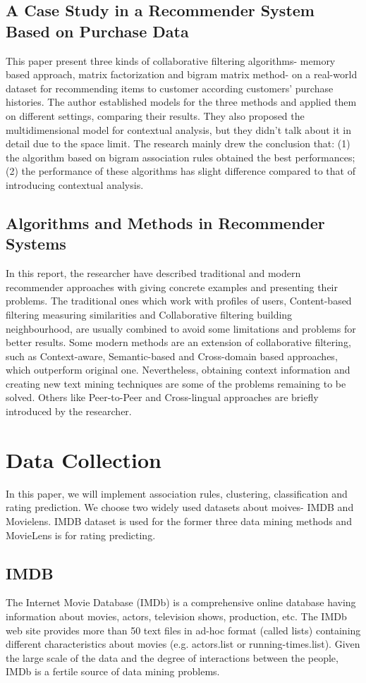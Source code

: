 \documentclass[conference]{IEEEtran}
\begin{document}
\subsection{A Case Study in a Recommender System Based on Purchase Data\cite{Bruno}}
This paper present three kinds of collaborative filtering algorithms- memory based approach, matrix factorization and bigram matrix method- on a real-world dataset for recommending items to customer according customers’ purchase histories. The author established models for the three methods and applied them on different settings, comparing their results. They also proposed the multidimensional model for contextual analysis, but they didn’t talk about it in detail due to the space limit. The research mainly drew the conclusion that: (1) the algorithm based on bigram association rules obtained the best performances; (2) the performance of these algorithms has slight difference compared to that of introducing contextual analysis.
\subsection{Algorithms and Methods in Recommender Systems\cite{Daniar}}
In this report, the researcher have described traditional and modern recommender approaches with giving concrete examples and presenting their problems. The traditional ones which work with profiles of users, Content-based filtering measuring similarities and Collaborative  filtering building neighbourhood, are usually combined to avoid some limitations and problems for better results. Some modern methods are an extension of collaborative filtering, such as Context-aware, Semantic-based and Cross-domain based approaches, which outperform original one. Nevertheless, obtaining context information and creating new text mining techniques are some of the problems remaining to be solved. Others like Peer-to-Peer and Cross-lingual approaches are briefly introduced by the researcher.

\section{Data Collection}
In this paper, we will implement association rules, clustering, classification and rating prediction. We choose two widely used datasets about moives- IMDB and Movielens. IMDB dataset is used for the former three data mining methods and MovieLens is for rating predicting.

\subsection{IMDB}
The Internet Movie Database (IMDb) is a comprehensive online database having information about movies, actors, television shows, production, etc. The IMDb web site\cite{imdb} provides more than 50 text files in ad-hoc format (called lists) containing different characteristics about movies (e.g. actors.list or running-times.list). Given the large scale of the data and the degree of interactions between the people, IMDb is a fertile source of data mining problems.
\end{document}
